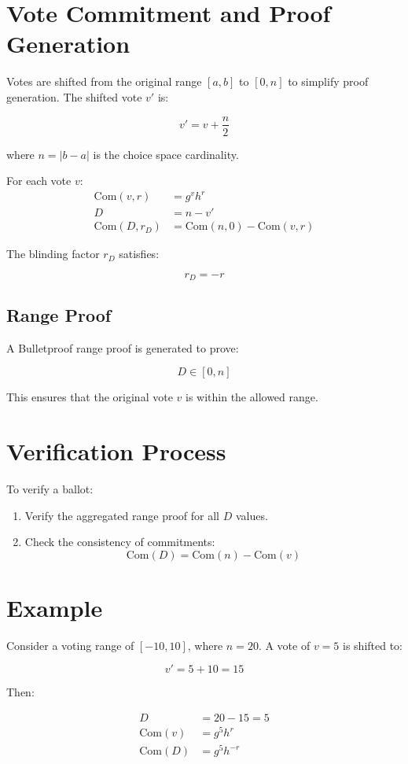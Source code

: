 \documentclass{article}
\begin{document}
\section{Vote Commitment and Proof Generation}
Votes are shifted from the original range \( [a, b] \) to \( [0, n] \) to simplify proof generation. The shifted vote \( v' \) is:

\[
 v' = v + \frac{n}{2}
\]

where \( n = |b - a| \) is the choice space cardinality.

For each vote \( v \):
\begin{align*}
    \text{Com}(v, r) &= g^v h^r \\
    D &= n - v' \\
    \text{Com}(D, r_D) &= \text{Com}(n, 0) - \text{Com}(v, r)
\end{align*}

The blinding factor \( r_D \) satisfies:

\[
 r_D = -r
\]

\subsection{Range Proof}
A Bulletproof range proof is generated to prove:

\[
D \in [0, n]
\]

This ensures that the original vote \( v \) is within the allowed range.

\section{Verification Process}
To verify a ballot:
\begin{enumerate}
    \item Verify the aggregated range proof for all \( D \) values.
    \item Check the consistency of commitments:
    \[
    \text{Com}(D) = \text{Com}(n) - \text{Com}(v)
    \]
\end{enumerate}

\section{Example}
Consider a voting range of \([-10, 10]\), where \( n = 20 \). A vote of \( v = 5 \) is shifted to:

\[
 v' = 5 + 10 = 15
\]

Then:

\begin{align*}
    D &= 20 - 15 = 5 \\
    \text{Com}(v) &= g^5 h^r \\
    \text{Com}(D) &= g^5 h^{-r}
\end{align*}
\end{document}
